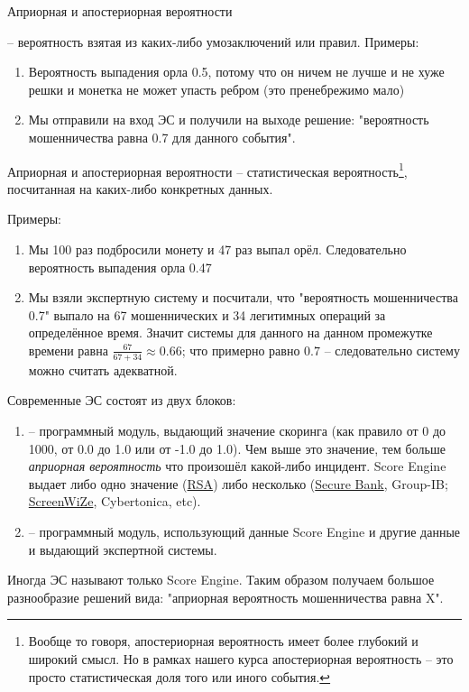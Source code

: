   \begin{frame}{Априорная и апостериорная вероятности}
  
   -- вероятность взятая из каких-либо умозаключений или правил.
  Примеры:
  \begin{enumerate}
  	\item Вероятность выпадения орла 0.5, потому что он ничем не лучше и не хуже решки и монетка не может упасть ребром (это пренебрежимо мало)
  	\item Мы отправили  на вход ЭС и получили на выходе решение: "вероятность мошенничества равна 0.7 для данного события".
  \end{enumerate}
   
  \end{frame}

  \begin{frame}{Априорная и апостериорная вероятности}
  	\small
{} -- статистическая вероятность\footnote{
	Вообще то говоря, апостериорная вероятность имеет более глубокий и широкий смысл.
	Но в рамках нашего курса апостериорная вероятность -- это просто статистическая доля того или иного события.}, посчитанная на каких-либо конкретных данных.

	Примеры: \small
	\begin{enumerate}
		\item Мы 100 раз подбросили монету и 47 раз выпал орёл. Следовательно 
		вероятность выпадения орла 0.47
		\item Мы взяли экспертную систему и посчитали, что  "вероятность мошенничества 0.7"
		выпало на 67 мошеннических и 34 легитимных операций за определённое время. 
		Значит  системы для данного  на данном промежутке времени равна $\frac{67}{67+34} \approx 0.66$; что примерно равно $0.7$ -- следовательно систему можно считать адекватной.
	\end{enumerate}
\end{frame}
  
  \begin{frame}
  Современные ЭС состоят из двух блоков:
  \begin{enumerate}
  	\item {} -- программный модуль, выдающий значение скоринга (как правило от 0 до 1000, от 0.0 до 1.0 или от -1.0 до 1.0). Чем выше это значение, тем больше
  	\textit{априорная вероятность} что произошёл какой-либо инцидент.
  	Score Engine выдает либо одно значение (\href{https://www.rsa.com/en-us/products/fraud-prevention}{RSA}) 
  	либо несколько (\href{https://www.group-ib.ru/secure-bank.html}{Secure Bank}, Group-IB; \href{https://cybertonica.com/screenwize/}{ScreenWiZe}, Cybertonica, etc).
  	\item {} -- программный модуль, использующий данные Score Engine и другие данные 
  	и выдающий  экспертной системы.
  \end{enumerate}

  Иногда ЭС называют только Score Engine. Таким образом получаем большое разнообразие решений вида: "априорная вероятность мошенничества равна X".
  \end{frame}
  
